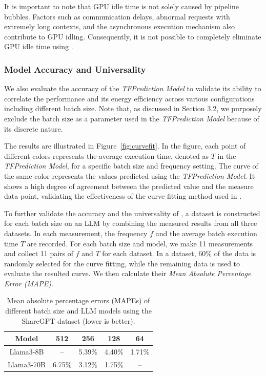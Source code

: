 It is important to note that GPU idle time is not solely caused by pipeline bubbles. 
Factors such as communication delays, abnormal requests with extremely long contexts, and the asynchronous execution mechanism also contribute to GPU idling. 
Consequently, it is not possible to completely eliminate GPU idle time using \thisproj{}.


\subsubsection{Model Accuracy and Universality}
\label{sec:evaluatecurvefitting}


We also evaluate the accuracy of the \textit{TFPrediction Model} to validate its ability to correlate the performance and its energy efficiency across various configurations including different batch size. 
%
Note that, as discussed in Section 3.2, we purposely exclude the batch size as a parameter used in the \emph{TFPrediction Model} because of its discrete nature.

The results are illustrated in Figure~\ref{fig:curvefit}. 
In the figure, each point of different colors represents the average execution time, denoted as $T$ in the \emph{TFPrediction Model}, for a specific batch size and frequency setting.
The curve of the same color represents the values predicted using the \textit{TFPrediction Model}.
It shows a high degree of agreement between the predicted value and the measure data point, validating the effectiveness of the curve-fitting method used in \thisproj{}.

To further validate the accuracy and the universality of \thisproj{}, a dataset is constructed for each batch size on an LLM by combining the measured results from all three datasets.
In each measurement, the frequency $f$ and the average batch execution time $T$ are recorded.
For each batch size and model, we make 11 measurements and collect 11 pairs of $f$ and $T$ for each dataset.
In a dataset, 60\% of the data is randomly selected for the curve fitting, while the remaining data is used to evaluate the resulted curve. 
We then calculate their \emph{Mean Absolute Percentage Error (MAPE)}.

\begin{table}
  \caption{Mean absolute percentage errors (MAPEs) of different batch size and LLM models using the ShareGPT dataset (lower is better).}
  \label{tab:mape}
  \begin{tabular}{ccccc}
    \toprule
    Model & 512 & 256 & 128 & 64 \\
    \midrule
    Llama3-8B & -- & 5.39\%  & 4.40\%  & 1.71\%  \\
    Llama3-70B & 6.75\% & 3.12\% & 1.75\% & --  \\
    \bottomrule
  \end{tabular}
\end{table}


